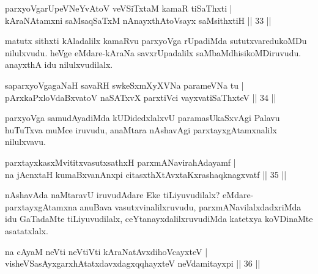 \begin{shl}
parxyoVgarUpeVNeYvAtoV veVSiTxtaM kamaR tiSaThxti |\\
kAraNAtamxni saMsaqSaTxM nAnayxthA\s toV\s sayx saMsithxtiH \hfill || 33 ||
\end{shl}

\begin{artha}%
matutx sithxti kAladalilx kamaRvu parxyoVga rUpadiMda sututxvaredukoMDu nilulxvudu. heVge eMdare-kAraNa savxrUpadalilx saMbaMdhisikoMDiruvudu. anayxthA idu nilulxvudilalx.
\end{artha}

\begin{shl}
saparxyoVgagaNaH savaRH swkeSxmXyXVNa parameVNa tu |\\
pArxkaPxloVdaBxvatoV naSATxvX parxtiVci vayxvatiSaThxteV \hfill || 34 ||
\end{shl}

\begin{artha}
parxyoVga samudAyadiMda kUDidedxlalxvU paramasUkaSxvAgi Palavu huTuTxva muMce iruvudu, anaMtara nAshavAgi parxtayxgAtamxnalilx nilulxvavu.
\end{artha}

\begin{shl}
parxtayxkasxMvititxvasutxsathxH parxmANavirahAdayamf |\\
na jAcnxtaH kumaBxvanAnxpi citasxthXtAvxtaKxrashaqknagxvatf \hfill || 35 ||
\end{shl}

\begin{artha}
nAshavAda naMtaravU iruvudAdare Eke tiLiyuvudilalx? eMdare- parxtayxgAtamxna anuBava vasutxvinalilxruvudu, parxmANavilalxdadxriMda idu GaTadaMte tiLiyuvudilalx, ceYtanayxdalilxruvudiMda katetxya koVDinaMte asatatxlalx.
\end{artha}


\begin{shl}
na cAyaM neVti neVtiVti kAraNatAvxdihoVcayxteV |\\
visheVSasAyxgarxhAtatxdavxdagxqqhayxteV neVdamitayxpi \hfill || 36 ||
\end{shl}

